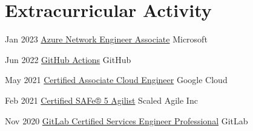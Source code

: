 \documentclass[a4paper]{twentysecondcv} %
\begin{document}
\section{Extracurricular Activity}
%
\begin{twenty} %
    \twentyitem
    {Jan 2023}
    {}
    {\href{https://www.credly.com/badges/f2b4e861-75b4-43cd-8cb5-98835bf5a2d3/public_url}{Azure Network Engineer Associate}}
    {Microsoft}
    {}
    {}
    
    \twentyitem
    {Jun 2022}
    {}
    {\href{https://www.credly.com/badges/4d91abb3-5f49-4f22-a0cc-d8d4f6841738/public_url}{GitHub Actions}}
    {GitHub}
    {}
    {}
    
    \twentyitem
    {May 2021}
    {}
    {\href{https://www.credential.net/3e7c1e77-e591-40d3-88ff-67494b422cfc?key=9d07014f6e1465d00a525436cfdb53cc8b7fd70ae353b12ea668dee572d2c797}{Certified Associate Cloud Engineer}}
    {Google Cloud}
    {}
    {}

    \twentyitem
    {Feb 2021}
    {}
    {\href{https://www.youracclaim.com/badges/deb40f91-a445-4e73-aed5-714988eefd80/}{Certified SAFe® 5 Agilist}}
    {Scaled Agile Inc}
    {}
    {}

    \twentyitem
    {Nov 2020}
    {}
    {\href{https://www.credly.com/badges/d9372b90-3057-4429-b61f-e8cd4c2b6615/public_url}{GitLab Certified Services Engineer Professional}}
    {GitLab}
    {}
    {}


\end{twenty}
\end{document}
